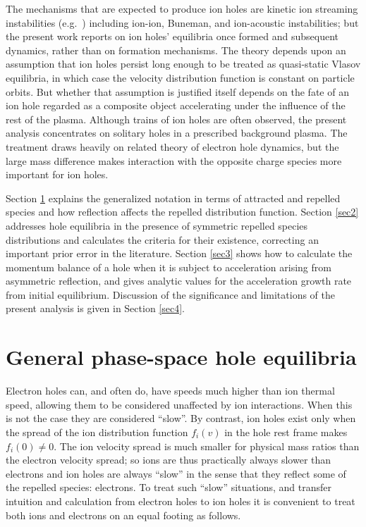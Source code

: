 \documentclass[aip,pop,article-title]{revtex4-2}
\begin{document}
The mechanisms that are expected to produce ion holes are kinetic ion
streaming instabilities (e.g.\ \cite{Muschietti2008}) including
ion-ion, Buneman, and ion-acoustic instabilities; but the present work
reports on ion holes' equilibria once formed and subsequent dynamics,
rather than on formation mechanisms. The theory depends upon an
assumption that ion holes persist long enough to be treated as
quasi-static Vlasov equilibria, in which case the velocity
distribution function is constant on particle orbits. But whether that
assumption is justified itself depends on the fate of an ion hole
regarded as a composite object accelerating under the influence of the
rest of the plasma.  Although trains of ion holes are often observed,
the present analysis concentrates on solitary holes in a prescribed
background plasma.  The treatment draws heavily on related theory of
electron hole dynamics\cite{Hutchinson2021d,Hutchinson2021c}, but the
large mass difference makes interaction with the opposite charge
species more important for ion holes.

Section \ref{sec1} explains the generalized notation in terms of
attracted and repelled species and how reflection affects the repelled
distribution function. Section \ref{sec2} addresses hole equilibria in
the presence of symmetric repelled species distributions and
calculates the criteria for their existence, correcting an important
prior error in the literature. Section \ref{sec3} shows how to
calculate the momentum balance of a hole when it is subject to
acceleration arising from asymmetric reflection, and gives analytic
values for the acceleration growth rate from initial
equilibrium. Discussion of the significance and limitations of the
present analysis is given in Section \ref{sec4}.

\section{General phase-space hole equilibria}\label{sec1}

Electron holes can, and often do, have speeds much higher than ion
thermal speed, allowing them to be considered unaffected by ion
interactions. When this is not the case they are considered ``slow''.
By contrast, ion holes exist only when the spread of the ion
distribution function $f_i(v)$ in the hole rest frame makes
$f_i(0)\not=0$. The ion velocity spread is much smaller for physical
mass ratios than the electron velocity spread; so ions are thus
practically always slower than electrons and ion holes are always
``slow'' in the sense that they reflect some of the repelled species:
electrons. To treat such ``slow'' situations, and transfer intuition
and calculation from electron holes to ion holes it is convenient to
treat both ions and electrons on an equal footing as follows.
\end{document}
